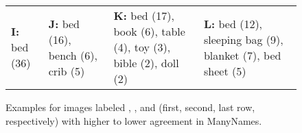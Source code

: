 \begin{figure*}[t]
{\begin{tabular}{p{3.4cm}p{3.4cm}p{3.6cm}p{3.6cm}}
 \textbf{I:} bed (36)  &
 \textbf{J:} bed (16), bench (6), crib (5) &
 \textbf{K:} bed (17), book (6), table (4), toy (3), bible (2), doll (2) &
 \textbf{L:} bed (12), sleeping bag (9), blanket (7), bed sheet (5)\\

       \end{tabular}
    }
  \caption{Examples for \vgenome images labeled , , and  (first, second, last row, respectively) with higher to lower agreement in ManyNames.} 
	\label{fig:ex-high-low-agreement}
\end{figure*}




